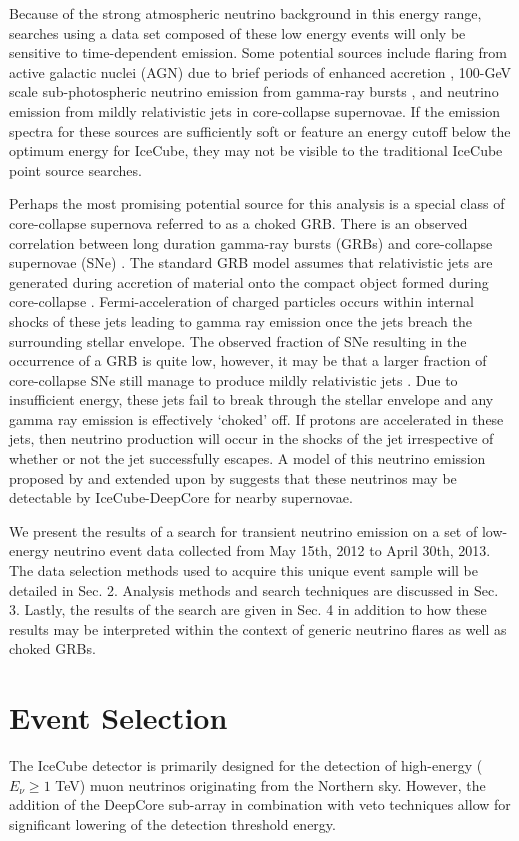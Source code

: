 \documentclass[manuscript]{aastex}
\begin{document}
Because of the strong atmospheric neutrino background in this energy range, searches using a data set composed of these low energy events will only be sensitive to time-dependent emission. Some potential sources include flaring from active galactic nuclei (AGN) due to brief periods of enhanced accretion \cite{?}, 100-GeV scale sub-photospheric neutrino emission from gamma-ray bursts \cite{?}, and neutrino emission from mildly relativistic jets in core-collapse supernovae. If the emission spectra for these sources are sufficiently soft or feature an energy cutoff below the optimum energy for IceCube, they may not be visible to the traditional IceCube point source searches.

Perhaps the most promising potential source for this analysis is a special class of core-collapse supernova referred to as a choked GRB. There is an observed correlation between long duration gamma-ray bursts (GRBs) and core-collapse supernovae (SNe) \cite{?}.  The standard GRB model assumes that relativistic jets are generated during accretion of material onto the compact object formed during core-collapse \cite{?}. Fermi-acceleration of charged particles occurs within internal shocks of these jets leading to gamma ray emission once the jets breach the surrounding stellar envelope.  The observed fraction of SNe resulting in the occurrence of a GRB is quite low, however, it may be that a larger fraction of core-collapse SNe still manage to produce mildly relativistic jets \cite{?}.  Due to insufficient energy, these jets fail to break through the stellar envelope and any gamma ray emission is effectively `choked' off. If protons are accelerated in these jets, then neutrino production will occur in the shocks of the jet irrespective of whether or not the jet successfully escapes. A model of this neutrino emission proposed by \cite{2004PhRvL..93r1101R} and extended upon by \cite{2005PhRvL..95f1103A} suggests that these neutrinos may be detectable by IceCube-DeepCore for nearby supernovae.

We present the results of a search for transient neutrino emission on a set of low-energy neutrino event data collected from May 15th, 2012 to April 30th, 2013. The data selection methods used to acquire this unique event sample will be detailed in Sec. 2. Analysis methods and search techniques are discussed in Sec. 3. Lastly, the results of the search are given in Sec. 4 in addition to how these results may be interpreted within the context of generic neutrino flares as well as choked GRBs.
\section{Event Selection}
The IceCube detector is primarily designed for the detection of high-energy ($E_{\nu} \geq 1$ TeV) muon neutrinos originating from the Northern sky. However, the addition of the DeepCore sub-array in combination with veto techniques allow for significant lowering of the detection threshold energy.
\end{document}
